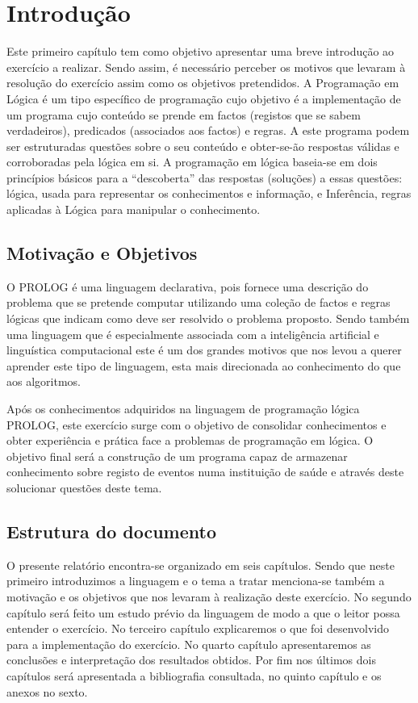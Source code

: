 \chapter{Introdução}
\label{cap:p1}
Este primeiro capítulo tem como objetivo apresentar uma breve introdução ao exercício a realizar. Sendo assim, é necessário perceber os motivos que levaram à resolução do exercício assim como os objetivos pretendidos.
A Programação em Lógica é um tipo específico de programação cujo objetivo é a implementação de um programa cujo conteúdo se prende em factos (registos que se sabem verdadeiros), predicados (associados aos factos) e regras. A este programa podem ser estruturadas questões sobre o seu conteúdo e obter-se-ão respostas válidas e corroboradas pela lógica em si.
A programação em lógica baseia-se em dois princípios básicos para a “descoberta” das respostas (soluções) a essas questões: lógica, usada para representar os conhecimentos e informação, e Inferência, regras aplicadas à Lógica para manipular o conhecimento.




\section{Motivação e Objetivos}
\label{p1:MotivObj}
O PROLOG é uma linguagem declarativa, pois fornece uma descrição do problema que se pretende computar utilizando uma coleção de factos e regras lógicas que indicam como deve ser resolvido o problema proposto. Sendo também uma linguagem que é especialmente associada com a inteligência artificial e linguística computacional este é um dos grandes motivos que nos levou a querer aprender este tipo de linguagem, esta mais direcionada ao conhecimento do que aos algoritmos. 


Após os conhecimentos adquiridos na linguagem de programação lógica PROLOG, este exercício surge com o objetivo de consolidar conhecimentos e obter experiência e prática face a problemas de programação em lógica. O objetivo final será a construção de um programa capaz de armazenar conhecimento sobre registo de eventos numa instituição de saúde e através deste solucionar questões deste tema.



\section{Estrutura do documento}
\label{p1:Estrutura}
O presente relatório encontra-se organizado em seis capítulos. Sendo que neste primeiro introduzimos a linguagem e o tema a tratar menciona-se também a motivação e os objetivos que nos levaram à realização deste exercício. 
No segundo capítulo será feito um estudo prévio da linguagem de modo a que o leitor possa entender o exercício. No terceiro capítulo explicaremos o que foi desenvolvido para a implementação do exercício. No quarto capítulo apresentaremos as conclusões e interpretação dos resultados obtidos. Por fim nos últimos dois capítulos será apresentada a bibliografia consultada, no quinto capítulo e os anexos no sexto. 




